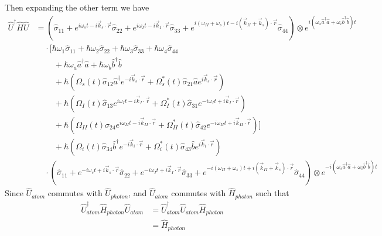 \documentclass[aps,pra,showpacs,amsmath,amssymb,nofootinbib,longbibliography,superscriptaddress
]{revtex4-1}
\theoremstyle{definition}
\theoremstyle{remark}
\newcommand{\0}{\hat{0}}
\begin{document}
Then expanding the other term we have
\begin{align}
    \hat{U}^{\dagger} \hat{H} \hat{U}
    &=
    \left(\hat{\sigma}_{11} + e^{i \omega_s t - i \vec{k}_s \cdot \vec{r}} \hat{\sigma}_{22} + e^{i \omega_I t - i \vec{k}_I \cdot \vec{r}} \hat{\sigma}_{33}  + e^{i(\omega_{II} + \omega_s) t - i(\vec{k}_{II} + \vec{k}_s) \cdot \vec{r}} \hat{\sigma}_{44}\right)
    \otimes e^{i(\omega_s \hat{a}^{\dagger} \hat{a} + \omega_i \hat{b}^{\dagger} \hat{b})t}\nonumber\\
    &\;\;\;\;\cdot\biggl[ \hbar \omega_1 \hat{\sigma}_{11} + \hbar \omega_2 \hat{\sigma}_{22} + \hbar \omega_3 \hat{\sigma}_{33} + \hbar \omega_4 \hat{\sigma}_{44}\nonumber \\
    &\;\;\;\;\;\;\;\;+ \hbar \omega_{a} \hat{a}^{\dagger} \hat{a} + \hbar \omega_{b} \hat{b}^{\dagger} \hat{b}\nonumber \\
    &\;\;\;\;\;\;\;\;+ \hbar \left(\Omega_{s}(t) \hat{\sigma}_{12} \hat{a}^{\dagger} e^{-i \vec{k}_{s} \cdot \vec{r}} + \Omega_{s}^*(t) \hat{\sigma}_{21} \hat{a} e^{i \vec{k}_{s} \cdot \vec{r}}\right)\nonumber \\
    &\;\;\;\;\;\;\;\;+ \hbar \left(\Omega_{I}(t) \hat{\sigma}_{13} e^{i \omega_I t - i \vec{k}_I \cdot \vec{r}} + \Omega_{I}^*(t) \hat{\sigma}_{31} e^{-i \omega_I t + i \vec{k}_I \cdot \vec{r}}\right)\nonumber \\
    &\;\;\;\;\;\;\;\;+ \hbar \left(\Omega_{II}(t) \hat{\sigma}_{24} e^{i \omega_{II} t - i \vec{k}_{II} \cdot \vec{r}} + \Omega_{II}^*(t) \hat{\sigma}_{42} e^{-i \omega_{II} t + i \vec{k}_{II} \cdot \vec{r}}\right)\biggr] \nonumber\\
    &\;\;\;\;\;\;\;\;+ \hbar \left(\Omega_{i}(t) \hat{\sigma}_{34} \hat{b}^{\dagger} e^{-i \vec{k}_{i} \cdot \vec{r}} + \Omega_{i}^*(t) \hat{\sigma}_{43} \hat{b} e^{i \vec{k}_{i} \cdot \vec{r}}\right)\nonumber \\
    &\;\;\;\; \cdot
    \left(\hat{\sigma}_{11} + e^{-i \omega_s t + i \vec{k}_s \cdot \vec{r}} \hat{\sigma}_{22} + e^{-i \omega_I t + i \vec{k}_I \cdot \vec{r}} \hat{\sigma}_{33} + e^{-i(\omega_{II} + \omega_s) t + i(\vec{k}_{II} + \vec{k}_s) \cdot \vec{r}} \hat{\sigma}_{44}\right)
    \otimes e^{-i(\omega_s \hat{a}^{\dagger} \hat{a} + \omega_i \hat{b}^{\dagger} \hat{b})t}
\end{align}
Since $\hat{U}_{atom}$ commutes with $\hat{U}_{photon}$, and $\hat{U}_{atom}$ commutes with $\hat{H}_{photon}$ such that
\begin{align}
    \hat{U}_{atom}^{\dagger} \hat{H}_{photon} \hat{U}_{atom} &= \hat{U}_{atom}^{\dagger} \hat{U}_{atom} \hat{H}_{photon} \nonumber \\
    &= \hat{H}_{photon}
\end{align}
\end{document}
